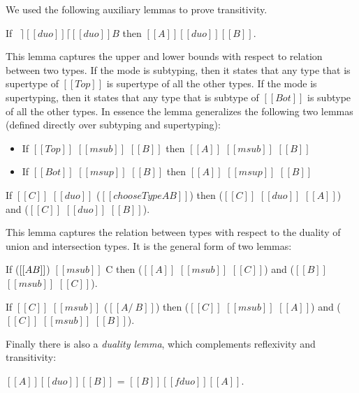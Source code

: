We used the following auxiliary lemmas to prove transitivity.

\begin{lemma}
  \label{lemma:invbound}
	If \ $\rceil [[duo]] \lceil [[duo]] B$  then $[[A]] [[duo]] [[B]]$.
\end{lemma}

This lemma captures the upper and lower bounds with respect to relation between two types.
If the mode is subtyping, then it states that any type that is supertype of $[[Top]]$ is supertype of all the other types.
If the mode is supertyping, then it states that any type that is subtype of $[[Bot]]$ is subtype of all the other types.
In essence the lemma generalizes the following two lemmas (defined directly over subtyping and supertyping):

\begin{itemize}
	\item{If $[[Top]]$ $[[msub]]$ $[[B]]$ then $[[A]]$ $[[msub]]$ $[[B]]$}
	\item{If $[[Bot]]$ $[[msup]]$ $[[B]]$ then $[[A]]$ $[[msup]]$ $[[B]]$}
\end{itemize}

\begin{lemma}
  \label{lemma:ddboth-inv}
  If $[[C]]$ $[[duo]]$ ($[[chooseType A  B]]$) then ($[[C]]$ $[[duo]]$ $[[A]]$) and  ($[[C]]$ $[[duo]]$ $[[B]]$).
\end{lemma}

This lemma captures the relation between types with respect to the duality of union and intersection types.
It is the general form of two lemmas:

\begin{lemma}
  \label{lemma:union:inv}
 If ($[[A \/  B]]$) $[[msub]]$ C then ($[[A]]$ $[[msub]]$ $[[C]]$) and  ($[[B]]$ $[[msub]]$ $[[C]]$).
\end{lemma}

\begin{lemma}
  \label{lemma:inter:inv}
  If $[[C]]$ $[[msub]]$ ($[[A /\  B]]$) then ($[[C]]$ $[[msub]]$ $[[A]]$) and  ($[[C]]$ $[[msub]]$ $[[B]]$).
\end{lemma}


\noindent Finally there is also a \emph{duality lemma}, which complements reflexivity and transitivity:

\begin{lemma}[Duality]
  \label{lemma:sym2}
   $[[A]] [[duo]] [[B]]$ = $[[B]] [[fduo]] [[A]]$.
\end{lemma}

